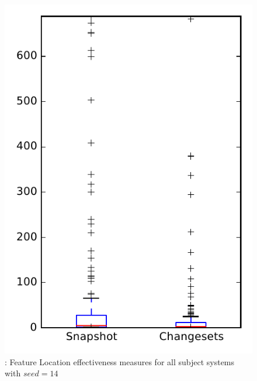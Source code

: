 
\begin{figure}
\centering
\includegraphics[height=0.4\textheight]{figures/flt_seed/rq1_overview_14}
\caption{\rone: Feature Location effectiveness measures for all subject systems with $seed=14$}
\label{fig:flt_seed:rq1:overview}
\end{figure}
